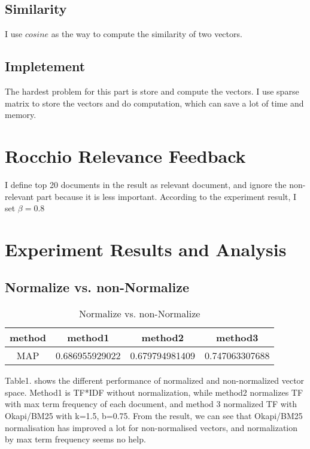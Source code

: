 \documentclass[11pt, oneside]{article}   	%
\begin{document}
\subsection{Similarity}
I use $cosine$ as the way to compute the similarity of two vectors.
\subsection{Impletement}
The hardest problem for this part is store and compute the vectors. I use sparse matrix to store the vectors and do computation, which can save a lot of time and memory.

\section{Rocchio Relevance Feedback}
I define top 20 documents in the result as relevant document, and ignore the non-relevant part because it is less important. According to the experiment result, I set $\beta=0.8$ 

\section{Experiment Results and Analysis}
\subsection{Normalize vs. non-Normalize}

\begin{table}[H]
\centering
\begin{tabular}{|c|c|c|c|}
\hline
method & method1        & method2        & method3     \\ \hline
MAP    & 0.686955929022 & 0.679794981409 & 0.747063307688 \\ \hline
\end{tabular}
\caption{ Normalize vs. non-Normalize}
\end{table}
\noindent Table1. shows the different performance of normalized and non-normalized vector space. Method1 is TF*IDF without normalization, while method2  normalizes TF with max term frequency of each document, and method 3 normalized TF with Okapi/BM25 with k=1.5, b=0.75. From the result, we can see that Okapi/BM25 normalisation has improved a lot for non-normalised vectors, and normalization by max term frequency seems no help.
\end{document}
